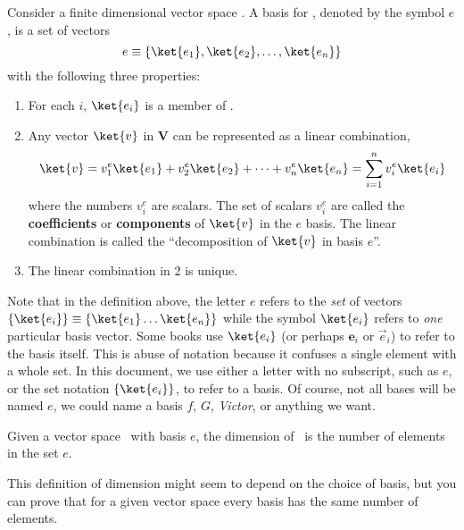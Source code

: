 \begin{definition}[Basis]
Consider a finite dimensional vector space \VS.
A basis for \VS, denoted by the symbol $e$, is a set of vectors
\begin{displaymath}
e \equiv \{\ket{e_1}, \ket{e_2}, \ldots, \ket{e_n}\}
\end{displaymath}
with the following three properties:
\begin{enumerate}
\item
For each $i$, $\ket{e_i}$ is a member of \VS.
\item
Any vector $\ket{v}$ in \textbf{V} can be represented as a linear combination,
\begin{displaymath}
\ket{v} = v^e_1 \ket{e_1} + v^e_2 \ket{e_2} + \cdots + v^e_n \ket{e_n} = \sum_{i=1}^n v^e_i \ket{e_i}
\end{displaymath}
where the numbers $v_i^e$ are scalars.
The set of scalars $v_i^e$ are called the \textbf{coefficients} or \textbf{components} of $\ket{v}$ in the $e$ basis.
The linear combination is called the ``decomposition of $\ket{v}$ in basis $e$''.
\item
The linear combination in 2 is unique.
\end{enumerate}
\end{definition}
Note that in the definition above, the letter $e$ refers to the \textit{set} of vectors $\{\ket{e_i}\} \equiv \{ \ket{e_1} \ldots \ket{e_n} \}$ while the symbol $\ket{e_i}$ refers to \emph{one} particular basis vector.
Some books use $\ket{e_i}$ (or perhaps $\mathbf{e}_i$ or $\vec{e}_i$) to refer to the basis itself.
This is abuse of notation because it confuses a single element with a whole set.
In this document, we use either a letter with no subscript, such as $e$, or the set notation $\{\ket{e_i}\}$, to refer to a basis.
Of course, not all bases will be named $e$, we could name a basis $f$, $G$, \textit{Victor}, or anything we want.

\begin{definition}[Dimension]
  Given a vector space \VS\, with basis $e$, the dimension of \VS\, is the number of elements in the set $e$.
\end{definition}
This definition of dimension might seem to depend on the choice of basis, but you can prove that for a given vector space every basis has the same number of elements.


